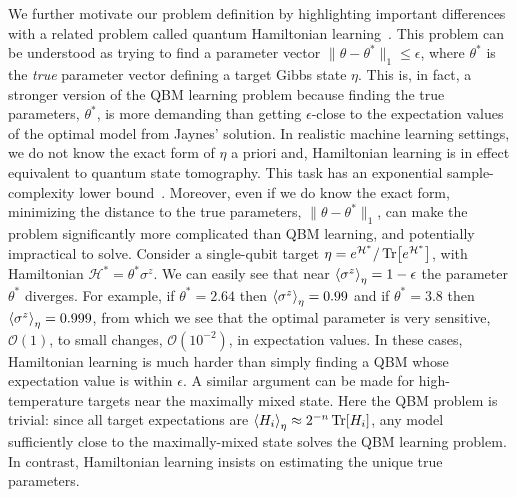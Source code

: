 \documentclass[
    reprint,
    aps,
    prx,
    longbibliography
]{revtex4-2}
\begin{document}
We further motivate our problem definition by highlighting important differences with a related problem called quantum Hamiltonian learning~\cite{Wiebe_2014, franca2020, Anshu_2021, Haah_2024, Rouze_2023, Onorati_2023}. This problem can be understood as trying to find a parameter vector $\|\theta-\theta^*\|_1 \leq \epsilon$, where $\theta^*$ is the \emph{true} parameter vector defining a target Gibbs state $\eta$. This is, in fact, a stronger version of the QBM learning problem because finding the true parameters, $\theta^*$, is more demanding than getting $\epsilon$-close to the expectation values of the optimal model from Jaynes' solution. In realistic machine learning settings, we do not know the exact form of $\eta$ a priori and, Hamiltonian learning is in effect equivalent to quantum state tomography. This task has an exponential sample-complexity lower bound~\cite{Aaronson_2017}. Moreover, even if we do know the exact form, minimizing the distance to the true parameters, $\|\theta-\theta^*\|_1$, can make the problem significantly more complicated than QBM learning, and potentially impractical to solve. Consider a single-qubit target $\eta = e^{\mathcal{H}^*} / \Tr[e^{\mathcal{H}^*}]$, with Hamiltonian $\mathcal{H}^*=\theta^* \sigma^z$. We can easily see that near $\expval{\sigma^z}_\eta=1-\epsilon$ the parameter $\theta^*$ diverges. For example, if $\theta^*=2.64$ then $\expval{\sigma^z}_\eta=0.99$ and if $\theta^*=3.8$ then $\expval{\sigma^z}_\eta=0.999$, from which we see that the optimal parameter is very sensitive, $\mathcal{O}(1)$, to small changes, $\mathcal{O}(10^{-2})$, in expectation values. In these cases, Hamiltonian learning is much harder than simply finding a QBM whose expectation value is within $\epsilon$. A similar argument can be made for high-temperature targets near the maximally mixed state. Here the QBM problem is trivial: since all target expectations are $\expval{H_i}_\eta \approx 2^{-n} \Tr[H_i]$, any model sufficiently close to the maximally-mixed state solves the QBM learning problem. In contrast, Hamiltonian learning insists on estimating the unique true parameters.
\end{document}
